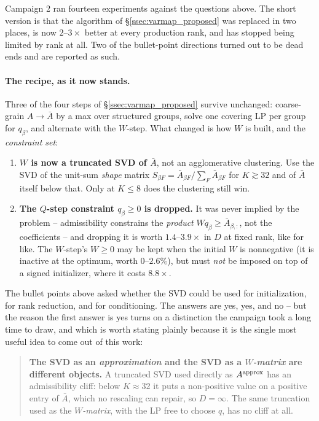 \documentclass{article}
\numberwithin{equation}{section}   %
\begin{document}
Campaign 2 ran fourteen experiments against the questions above. The short version is that the
algorithm of \S\ref{ssec:varmap_proposed} was replaced in two places, is now $2$--$3\times$
better at every production rank, and has stopped being limited by rank at all. Two of the
bullet-point directions turned out to be dead ends and are reported as such.

\paragraph{The recipe, as it now stands.}
Three of the four steps of \S\ref{ssec:varmap_proposed} survive unchanged: coarse-grain
$A \rightarrow \bar A$ by a max over structured groups, solve one covering LP per group for
$q_\beta$, and alternate with the $W$-step. What changed is how $W$ is built, and the
{\em constraint set}:

\begin{enumerate}
\item {\bf $W$ is now a truncated SVD of $\bar A$}, not an agglomerative clustering.
 Use the SVD of the unit-sum {\em shape} matrix $S_{\beta F} = \bar A_{\beta F}/\sum_F \bar A_{\beta F}$
 for $K \gtrsim 32$ and of $\bar A$ itself below that. Only at $K \le 8$ does the clustering
 still win.
\item {\bf The $Q$-step constraint $q_\beta \ge 0$ is dropped.} It was never implied by the
 problem -- admissibility constrains the {\em product} $W q_\beta \ge \bar A_{\beta,:}$, not the
 coefficients -- and dropping it is worth $1.4$--$3.9\times$ in $D$ at fixed rank, like for like.
 The $W$-step's $W \ge 0$ may be kept when the initial $W$ is nonnegative (it is inactive at the
 optimum, worth $0$--$2.6\%$), but must {\em not} be imposed on top of a signed initializer,
 where it costs $8.8\times$.
\end{enumerate}

\par\noindent
The bullet points above asked whether the SVD could be used for initialization, for rank
reduction, and for conditioning. The answers are yes, yes, and no -- but the reason the first
answer is yes turns on a distinction the campaign took a long time to draw, and which is worth
stating plainly because it is the single most useful idea to come out of this work:

\begin{quote}
{\bf The SVD as an {\em approximation} and the SVD as a {\em $W$-matrix} are different objects.}
A truncated SVD used directly as $A^{\rm approx}$ has an admissibility cliff: below $K \approx 32$
it puts a non-positive value on a positive entry of $\bar A$, which no rescaling can repair, so
$D = \infty$. The same truncation used as the {\em $W$-matrix}, with the LP free to choose
$q$, has no cliff at all.
\end{quote}
\end{document}
